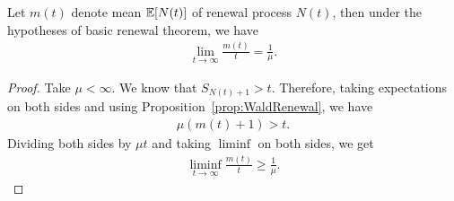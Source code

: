 \documentclass[a4paper,10pt, english]{article}
\begin{document}
\begin{thm} Let $m(t)$ denote mean $\mathbb{E}[N(t)]$ of renewal process $N(t)$, then under the hypotheses of basic renewal theorem, we have 
	\begin{align*}
	\lim_{t \to \infty}\frac{m(t)}{t} = \frac{1}{\mu}.
	\end{align*}
\end{thm}
\begin{proof}
	Take $\mu < \infty$. We know that $S_{N(t)+1} > t$. Therefore, taking expectations on both sides and using Proposition~\ref{prop:WaldRenewal}, we have 
	\begin{align*}
	\mu (m(t) + 1) > t.
	\end{align*}
	Dividing both sides by $\mu t$ and taking $\liminf$ on both sides, we get
\begin{align*}
\liminf_{t \to \infty} \frac{m(t)}{t} \geq \frac{1}{\mu}.
\end{align*}
	

\end{proof}
\end{document}
